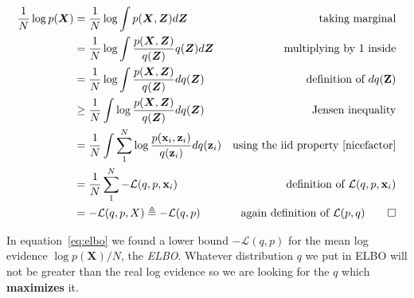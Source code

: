 \documentclass[11pt, a4paper]{report}
\theoremstyle{plain}
\theoremstyle{definition}
\theoremstyle{remark}
\newcommand{\x}{\mathbf{x}}
\newcommand{\Z}{\mathbf{Z}}
\newcommand{\z}{\mathbf{z}}
\newcommand{\LL}{\mathcal{L}}
\newcommand{\bv}[1]{\boldsymbol{#1}}
\begin{document}

{\small
\begin{equation}
\label{eq:elbo}
\begin{aligned}
\frac{1}{N} \log p(\bv{X}) &= \frac{1}{N} \log \int p(\bv{X},\bv{Z}) d\bv{Z} 
& \text{taking marginal} \\
& = \frac{1}{N} \log \int \frac{p(\bv{X},\bv{Z})}{q(\bv{Z})} q(\bv{Z})d\bv{Z} 
& \text{multiplying by 1 inside}\\
&=  \frac{1}{N} \log \int \frac{p(\bv{X},\bv{Z})}{q(\bv{Z})}dq(\bv{Z}) 
& \text{definition of } dq(\Z)\\
&\geq  \frac{1}{N} \int \log \frac{p(\bv{X},\bv{Z})}{q(\bv{Z})}dq(\bv{Z}) 
& \text{Jensen inequality}\\
&= \frac{1}{N} \int \sum_1^N \log \frac{p(\x_i, \z_i)}{q(\z_i)}dq(\z_i) 
& \text{using the iid property~\ref{nicefactor}}\\
&= \frac{1}{N} \sum_1^N - \LL(q,p,\x_i)
& \text{definition of } \LL(q,p,\x_i)\\
& = -\mathcal{L}(q,p,X) \triangleq -\mathcal{L}(q,p)
& \text{again definition of } \LL(p,q) \qed
\end{aligned}
\end{equation}
}

In equation~\ref{eq:elbo} we found a lower bound $-\mathcal{L}(q,p)$ for the
mean log
evidence $\log p(\bv{X})/N$, the \emph{ELBO}.
Whatever distribution $q$ we put in ELBO will not be
greater than the real log evidence so we are looking for the $q$ which
\textbf{maximizes} it.
\end{document}
